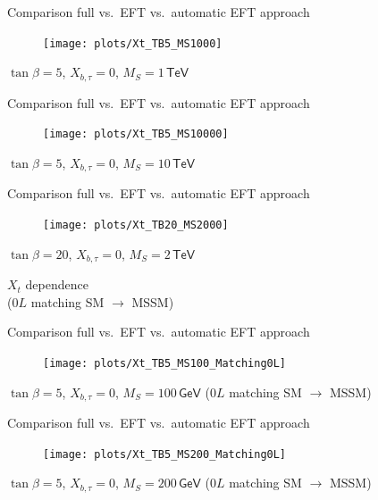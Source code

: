 \documentclass[hyperref={pdfpagelabels=false},ngerman]{beamer}
\newcommand{\eh}[1]{\,\mathsf{#1}}
\begin{document}
\begin{frame}[noframenumbering]{Comparison full vs.\ EFT vs.\ automatic EFT approach}
  \begin{figure}
    \centering
    \texttt{[image: plots/Xt\_TB5\_MS1000]}
  \end{figure}
  $\tan\beta = 5$, $X_{b,\tau} = 0$, $M_S = 1\eh{TeV}$
\end{frame}

\begin{frame}[noframenumbering]{Comparison full vs.\ EFT vs.\ automatic EFT approach}
  \begin{figure}
    \centering
    \texttt{[image: plots/Xt\_TB5\_MS10000]}
  \end{figure}
  $\tan\beta = 5$, $X_{b,\tau} = 0$, $M_S = 10\eh{TeV}$
\end{frame}

\begin{frame}[noframenumbering]{Comparison full vs.\ EFT vs.\ automatic EFT approach}
  \begin{figure}
    \centering
    \texttt{[image: plots/Xt\_TB20\_MS2000]}
  \end{figure}
  $\tan\beta = 20$, $X_{b,\tau} = 0$, $M_S = 2\eh{TeV}$
\end{frame}


\begin{frame}[noframenumbering]
  \begin{center}
    {\Large $X_t$ dependence}\\[1em]
    ($0L$ matching SM $\rightarrow$ MSSM)
  \end{center}
\end{frame}

\begin{frame}[noframenumbering]{Comparison full vs.\ EFT vs.\ automatic EFT approach}
  \begin{figure}
    \centering
    \texttt{[image: plots/Xt\_TB5\_MS100\_Matching0L]}
  \end{figure}
  $\tan\beta = 5$, $X_{b,\tau} = 0$, $M_S = 100\eh{GeV}$ ($0L$ matching SM $\rightarrow$ MSSM)
\end{frame}

\begin{frame}[noframenumbering]{Comparison full vs.\ EFT vs.\ automatic EFT approach}
  \begin{figure}
    \centering
    \texttt{[image: plots/Xt\_TB5\_MS200\_Matching0L]}
  \end{figure}
  $\tan\beta = 5$, $X_{b,\tau} = 0$, $M_S = 200\eh{GeV}$ ($0L$ matching SM $\rightarrow$ MSSM)
\end{frame}
\end{document}
